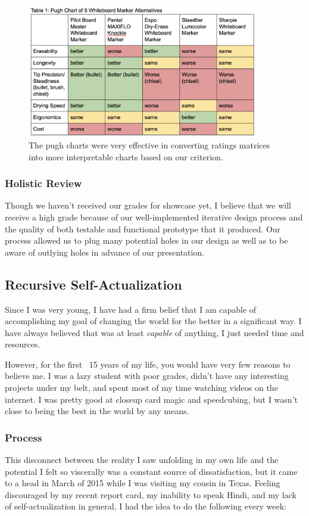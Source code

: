 \documentclass[a4paper,12pt]{article}
\begin{document}
\begin{figure}[H]
\centering
\includegraphics[width=0.9\textwidth]{img/image020.png}
\caption{The pugh charts were very effective in converting ratings matrices into more interpretable charts based on our criterion.}
\label{}
\end{figure}

\subsubsection{Holistic Review}
Though we haven’t received our grades for showcase yet, I believe that we will receive a high grade because of our well-implemented iterative design process and the quality of both testable and functional prototype that it produced. Our process allowed us to plug many potential holes in our design as well as to be aware of outlying holes in advance of our presentation.

\subsection{Recursive Self-Actualization}
\label{sec:self}
Since I was very young, I have had a firm belief that I am capable of accomplishing my goal of changing the world for the better in a significant way. I have always believed that was at least \textit{capable} of anything, I just needed time and resources.

However, for the first ~15 years of my life, you would have very few reasons to believe me. I was a lazy student with poor grades, didn’t have any interesting projects under my belt, and spent most of my time watching videos on the internet. I was pretty good at closeup card magic and speedcubing, but I wasn’t close to being the best in the world by any means.


\subsubsection{Process}
This disconnect between the reality I saw unfolding in my own life and the potential I felt so viscerally was a constant source of dissatisfaction, but it came to a head in March of 2015 while I was visiting my cousin in Texas. Feeling discouraged by my recent report card, my inability to speak Hindi, and my lack of self-actualization in general, I had the idea to do the following every week:
\end{document}
